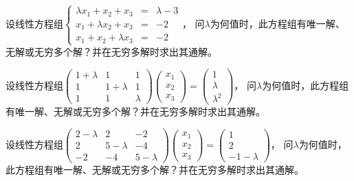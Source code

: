 \begin{frame}\ft{\subsecname}    
    \begin{li}
      设线性方程组$\left\{
      \begin{array}{rcl}
        \lambda x_1+x_2+x_3&=&\lambda-3\\
        x_1+\lambda x_2+x_3&=&-2\\
        x_1+x_2+\lambda x_3&=&-2
      \end{array}
      \right.$，
      问$\lambda$为何值时，此方程组有唯一解、无解或无穷多个解？并在无穷多解时求出其通解。
    \end{li}
  
\end{frame}



\begin{frame}\ft{\subsecname}
  
    \begin{li}[2008-2009第一学期]
      设线性方程组$\left(
      \begin{array}{ccc}
        1+\lambda&1&1\\
        1&1+\lambda&1\\
        1&1&\lambda
      \end{array}
      \right)\left(
      \begin{array}{c}
        x_1\\x_2\\x_3
      \end{array}
      \right)=\left(
      \begin{array}{c}
        1\\\lambda\\\lambda^2
      \end{array}
      \right)$，
      问$\lambda$为何值时，此方程组有唯一解、无解或无穷多个解？并在无穷多解时求出其通解。
    \end{li}
\end{frame}


\begin{frame}\ft{\subsecname}
    \begin{li}[2009-2010第一学期]
      设线性方程组$\left(
      \begin{array}{ccc}
        2-\lambda&2&-2\\
        2&5-\lambda&-4\\
        -2&-4&5-\lambda
      \end{array}
      \right)\left(
      \begin{array}{c}
        x_1\\x_2\\x_3
      \end{array}
      \right)=\left(
      \begin{array}{c}
        1\\2 \\-1-\lambda
      \end{array}
      \right)$，
      问$\lambda$为何值时，此方程组有唯一解、无解或无穷多个解？并在无穷多解时求出其通解。
    \end{li}
  
\end{frame}






